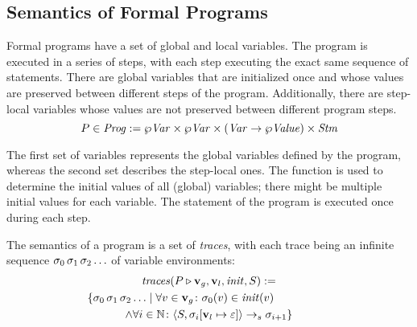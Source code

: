 \documentclass{article}
\begin{document}
\subsection{Semantics of Formal Programs}

Formal programs have a set of global and local variables. The program is executed in a series of steps, with each step executing
the exact same sequence of statements. There are global variables that are initialized once and whose values are preserved between
different steps of the program. Additionally, there are step-local variables whose values are not preserved between different
program steps.
\begin{equation*}
	P \in \mathit{Prog} := \wp \mathit{Var} \times \wp \mathit{Var} \times (\mathit{Var} \rightarrow \wp \mathit{Value}) \times \mathit{Stm}
\end{equation*}

The first set of variables represents the global variables defined by the program, whereas the second set describes the step-local
ones. The function is used to determine the initial values of all (global) variables; there might be multiple initial
values for each variable. The statement of the program is executed once during each step.

The semantics of a program is a set of \textit{traces}, with each trace being an infinite sequence $\sigma_0 \,
\sigma_1 \, \sigma_2 \ldots$ of variable environments:
\begin{multline*}
	\mathit{traces}(\prog \triangleright \toSet{\var}_g, \toSet{\var}_l, \mathit{init}, \stm) :=
	\\ \shoveright{
	\{ \varEnv_0 \, \varEnv_1 \, \varEnv_2 \ldots \mid 
		\forall \var \in \toSet{\var}_g \colon \varEnv_0(\var) \in \mathit{init}(\var) \qquad \qquad}
	\\ \wedge
		\forall i \in \mathbb{N} \colon \configuration{\stm, \varEnv_i[\toSet{\var}_l \mapsto \missing]} \stmArrow \varEnv_{i+1}
		\}
\end{multline*}
\end{document}

